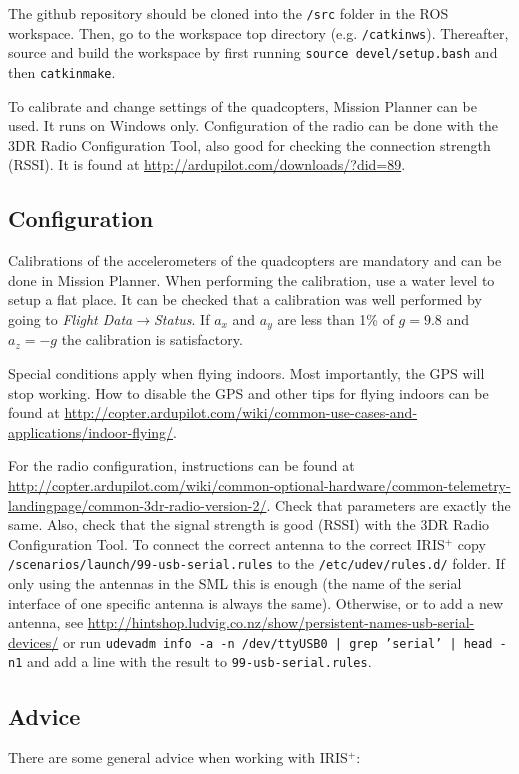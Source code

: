\documentclass[titlepage,11pt,a4paper]{article}
\begin{document}
The github repository should be cloned into the \texttt{/src} folder
in the ROS workspace. Then, go to the workspace top directory (e.g.
\texttt{/catkin\textunderscore ws}). Thereafter, source and build the
workspace by first running \texttt{source devel/setup.bash} and then
\texttt{catkin\textunderscore make}.

To calibrate and change settings of the quadcopters, Mission Planner
can be used. It runs on Windows only. Configuration of the radio can
be done with the 3DR Radio Configuration Tool, also good for checking
the connection strength (RSSI). It is found at
\url{http://ardupilot.com/downloads/?did=89}.


\subsection{Configuration}
\label{subsec:configuration}
Calibrations of the accelerometers of the quadcopters are mandatory
and can be done in Mission Planner. When performing the calibration,
use a water level to setup a flat place. It can be checked that a
calibration was well performed by going to \textit{Flight
 Data}$\rightarrow$\textit{Status}. If $a_x$ and $a_y$ are less than
1\% of $g = 9.8$ and $a_z = -g$ the calibration is satisfactory.

Special conditions apply when flying indoors. Most importantly, the
GPS will stop working. How to disable the GPS and other tips for
flying indoors can be found at \url{http://copter.ardupilot.com/wiki/common-use-cases-and-applications/indoor-flying/}.

For the radio configuration, instructions can be found at
\url{http://copter.ardupilot.com/wiki/common-optional-hardware/common-telemetry-landingpage/common-3dr-radio-version-2/}. Check
that parameters are exactly the same. Also, check that the signal
strength is good (RSSI) with the 3DR Radio Configuration Tool. To
connect the correct antenna to the correct IRIS$^+$ copy
\texttt{/scenarios/launch/99-usb-serial.rules} to the
\texttt{/etc/udev/rules.d/} folder. If only using the antennas in the
SML this is enough (the name of the serial interface of one specific antenna is always
the same). Otherwise, or to add a new antenna, see
\url{http://hintshop.ludvig.co.nz/show/persistent-names-usb-serial-devices/}
or run \texttt{udevadm info -a -n /dev/ttyUSB0 | grep '{serial}' |
  head -n1} and add a line with the result to
\texttt{99-usb-serial.rules}.

\subsection{Advice}
\label{subsec:advice}
There are some general advice when working with IRIS$^+$:
\end{document}
